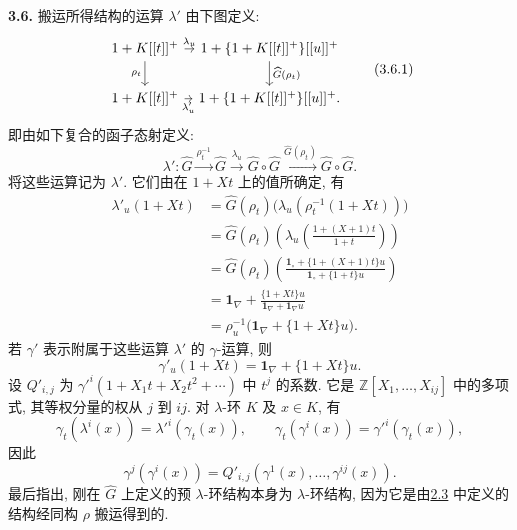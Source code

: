 \textbf{3.6.} 搬运所得结构的运算 \(\lambda'\) 由下图定义:
\[
\begin{tikzcd}[column sep=tiny]
1+K[[t]]^+ \arrow[r,"\lambda_u"] \arrow[d,"\rho_t"'] &
1+\{1+K[[t]]^+\}[[u]]^+ \arrow[d,"\Ghat(\rho_t)"]\\
1+K[[t]]^+ \arrow[r,"\lambda'_u"'] &
1+\{1+K[[t]]^+\}[[u]]^+ .
\end{tikzcd}
\tag{3.6.1}
\]
即由如下复合的函子态射定义:
\[
 \lambda':\widehat G\xrightarrow{\rho_t^{-1}}\widehat G
 \xrightarrow{\lambda_u}\widehat G\circ\widehat G
 \xrightarrow{\widehat G(\rho_t)}\widehat G\circ\widehat G.
\]
将这些运算记为 \(\lambda'\). 它们由在 \(1+Xt\) 上的值所确定, 有
\[
 \begin{aligned}
 \lambda'_u(1+Xt)
 &=\widehat G(\rho_t)\bigl(\lambda_u(\rho_t^{-1}(1+Xt))\bigr)\\
 &=\widehat G(\rho_t)\!\left(
       \lambda_u\!\left(\frac{1+(X+1)t}{1+t}\right)\right)\\
 &=\widehat G(\rho_t)\!\left(
       \frac{\mathbf1_{\circ}+\{1+(X+1)t\}u}
            {\mathbf1_{\circ}+\{1+t\}u}\right)\\
 &=\mathbf1_{\nabla}
       +\frac{\{1+Xt\}u}{\mathbf1_{\nabla}+\mathbf1_{\nabla}u}\\
 &=\rho_u^{-1}\bigl(\mathbf1_{\nabla}+\{1+Xt\}u\bigr).
 \end{aligned}
\]
若 \(\gamma'\) 表示附属于这些运算 \(\lambda'\) 的 \(\gamma\)-运算, 则
\begin{equation}\tag{3.6.2}
  \gamma'_u(1+Xt)=\mathbf1_{\nabla}+\{1+Xt\}u .
\end{equation}
设 \(Q'_{i,j}\) 为 \(\gamma'^i(1+X_1t+X_2t^2+\cdots)\) 中 \(t^j\) 的系数. 它是 \(\mathbb Z[X_1,\ldots,X_{ij}]\) 中的多项式, 其等权分量的权从 \(j\) 到 \(ij\). 对 \(\lambda\)-环 \(K\) 及 \(x\in K\), 有
\begin{equation}\tag{3.6.3}
  \gamma_t(\lambda^i(x))=\lambda'^i(\gamma_t(x)),
  \qquad
  \gamma_t(\gamma^i(x))=\gamma'^i(\gamma_t(x)),
\end{equation}
因此
\begin{equation}\tag{3.6.4}
  \gamma^j(\gamma^i(x))
  =Q'_{i,j}(\gamma^1(x),\ldots,\gamma^{ij}(x)).
\end{equation}
最后指出, 刚在 \(\widehat G\) 上定义的预 \(\lambda\)-环结构本身为 \(\lambda\)-环结构, 因为它是由\hyperlink{sga6.e05.eq.2-3-1}{2.3} 中定义的结构经同构 \(\rho\) 搬运得到的.

